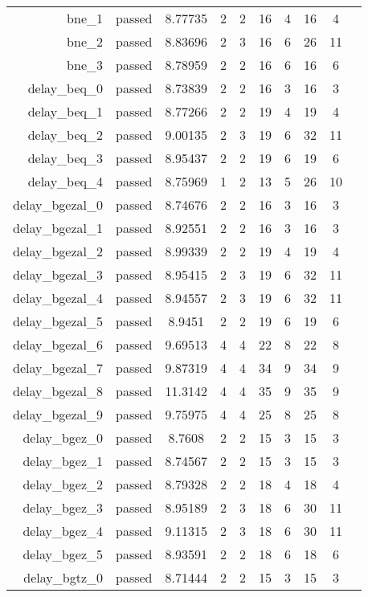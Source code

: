 \begin{longtable}{r|ccccccccc}
    bne\_1 & passed & 8.77735 & 2 & 2 & 16 & 4 & 16 & 4 \\
    bne\_2 & passed & 8.83696 & 2 & 3 & 16 & 6 & 26 & 11 \\
    bne\_3 & passed & 8.78959 & 2 & 2 & 16 & 6 & 16 & 6 \\
    delay\_beq\_0 & passed & 8.73839 & 2 & 2 & 16 & 3 & 16 & 3 \\
    delay\_beq\_1 & passed & 8.77266 & 2 & 2 & 19 & 4 & 19 & 4 \\
    delay\_beq\_2 & passed & 9.00135 & 2 & 3 & 19 & 6 & 32 & 11 \\
    delay\_beq\_3 & passed & 8.95437 & 2 & 2 & 19 & 6 & 19 & 6 \\
    delay\_beq\_4 & passed & 8.75969 & 1 & 2 & 13 & 5 & 26 & 10 \\
    delay\_bgezal\_0 & passed & 8.74676 & 2 & 2 & 16 & 3 & 16 & 3 \\
    delay\_bgezal\_1 & passed & 8.92551 & 2 & 2 & 16 & 3 & 16 & 3 \\
    delay\_bgezal\_2 & passed & 8.99339 & 2 & 2 & 19 & 4 & 19 & 4 \\
    delay\_bgezal\_3 & passed & 8.95415 & 2 & 3 & 19 & 6 & 32 & 11 \\
    delay\_bgezal\_4 & passed & 8.94557 & 2 & 3 & 19 & 6 & 32 & 11 \\
    delay\_bgezal\_5 & passed & 8.9451 & 2 & 2 & 19 & 6 & 19 & 6 \\
    delay\_bgezal\_6 & passed & 9.69513 & 4 & 4 & 22 & 8 & 22 & 8 \\
    delay\_bgezal\_7 & passed & 9.87319 & 4 & 4 & 34 & 9 & 34 & 9 \\
    delay\_bgezal\_8 & passed & 11.3142 & 4 & 4 & 35 & 9 & 35 & 9 \\
    delay\_bgezal\_9 & passed & 9.75975 & 4 & 4 & 25 & 8 & 25 & 8 \\
    delay\_bgez\_0 & passed & 8.7608 & 2 & 2 & 15 & 3 & 15 & 3 \\
    delay\_bgez\_1 & passed & 8.74567 & 2 & 2 & 15 & 3 & 15 & 3 \\
    delay\_bgez\_2 & passed & 8.79328 & 2 & 2 & 18 & 4 & 18 & 4 \\
    delay\_bgez\_3 & passed & 8.95189 & 2 & 3 & 18 & 6 & 30 & 11 \\
    delay\_bgez\_4 & passed & 9.11315 & 2 & 3 & 18 & 6 & 30 & 11 \\
    delay\_bgez\_5 & passed & 8.93591 & 2 & 2 & 18 & 6 & 18 & 6 \\
    delay\_bgtz\_0 & passed & 8.71444 & 2 & 2 & 15 & 3 & 15 & 3 \\

\end{longtable}
